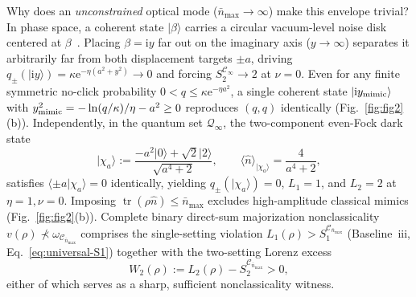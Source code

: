 \documentclass{iopjournal}
\newcommand{\tr}{\operatorname{tr}}
\newcommand{\Cset}{\mathcal{C}}
\newcommand{\Qset}{\mathcal{Q}}
\newcommand{\nbar}{\bar n_{\max}}
\newcommand{\ket}[1]{\lvert #1\rangle}
\newcommand{\braket}[2]{\langle #1\vert #2\rangle}
\newcommand{\ii}{\mathrm{i}}
\newcommand{\ee}{\mathrm{e}}
\begin{document}
Why does an \emph{unconstrained} optical mode ($\nbar \to \infty$) make this envelope trivial? In phase space, a coherent state $\ket{\beta}$ carries a circular vacuum-level noise disk centered at $\beta$~\cite{GerryKnight2005}. Placing $\beta = \ii y$ far out on the imaginary axis ($y \to \infty$) separates it arbitrarily far from both displacement targets $\pm a$, driving $q_\pm(\ket{\ii y}) = \kappa\ee^{-\eta(a^2+y^2)} \to 0$ and forcing $S_2^{\Cset_\infty} \to 2$ at $\nu = 0$. Even for any finite symmetric no-click probability $0 < q \le \kappa\ee^{-\eta a^2}$, a single coherent state $\ket{\ii y_{\rm mimic}}$ with $y_{\rm mimic}^2 = -\ln(q/\kappa)/\eta - a^2 \ge 0$ reproduces $(q,q)$ identically (Fig.~\ref{fig:fig2}(b)). Independently, in the quantum set $\Qset_\infty$, the two-component even-Fock dark state
\begin{equation}\label{eq:darkstate}
\ket{\chi_a} := \frac{-a^2\ket{0} + \sqrt{2}\ket{2}}{\sqrt{a^4 + 2}}, \qquad \langle\hat n\rangle_{\ket{\chi_a}} = \frac{4}{a^4 + 2},
\end{equation}
satisfies $\braket{\pm a}{\chi_a} = 0$ identically, yielding $q_\pm(\ket{\chi_a}) = 0$, $L_1 = 1$, and $L_2 = 2$ at $\eta = 1, \nu = 0$. Imposing $\tr(\rho\hat n) \le \nbar$ excludes high-amplitude classical mimics (Fig.~\ref{fig:fig2}(b)). Complete binary direct-sum majorization nonclassicality $v(\rho) \not\prec \omega_{\Cset_{\nbar}}$ comprises the single-setting violation $L_1(\rho) > S_1^{\Cset_{\nbar}}$ (Baseline~iii, Eq.~\eqref{eq:universal-S1}) together with the two-setting Lorenz excess
\begin{equation}\label{eq:W2-def}
W_2(\rho) := L_2(\rho) - S_2^{\Cset_{\nbar}} > 0,
\end{equation}
either of which serves as a sharp, sufficient nonclassicality witness.
\end{document}
